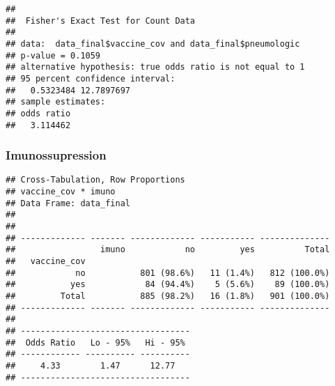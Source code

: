 \documentclass[
]{article}
\newenvironment{Shaded}{\begin{snugshade}}{\end{snugshade}}
\newcommand{\AttributeTok}[1]{\textcolor[rgb]{0.77,0.63,0.00}{#1}}
\newcommand{\ConstantTok}[1]{\textcolor[rgb]{0.00,0.00,0.00}{#1}}
\newcommand{\FunctionTok}[1]{\textcolor[rgb]{0.00,0.00,0.00}{#1}}
\newcommand{\NormalTok}[1]{#1}
\newcommand{\SpecialCharTok}[1]{\textcolor[rgb]{0.00,0.00,0.00}{#1}}
\newcommand{\StringTok}[1]{\textcolor[rgb]{0.31,0.60,0.02}{#1}}
\begin{document}
\begin{Shaded}
\end{Shaded}

\begin{verbatim}
## 
##  Fisher's Exact Test for Count Data
## 
## data:  data_final$vaccine_cov and data_final$pneumologic
## p-value = 0.1059
## alternative hypothesis: true odds ratio is not equal to 1
## 95 percent confidence interval:
##   0.5323484 12.7897697
## sample estimates:
## odds ratio 
##   3.114462
\end{verbatim}

\hypertarget{imunossupression}{%
\subsubsection{Imunossupression}\label{imunossupression}}

\begin{Shaded}
\end{Shaded}

\begin{verbatim}
## Cross-Tabulation, Row Proportions  
## vaccine_cov * imuno  
## Data Frame: data_final  
## 
## 
## ------------- ------- ------------- ----------- --------------
##                 imuno            no         yes          Total
##   vaccine_cov                                                 
##            no           801 (98.6%)   11 (1.4%)   812 (100.0%)
##           yes            84 (94.4%)    5 (5.6%)    89 (100.0%)
##         Total           885 (98.2%)   16 (1.8%)   901 (100.0%)
## ------------- ------- ------------- ----------- --------------
## 
## ----------------------------------
##  Odds Ratio   Lo - 95%   Hi - 95% 
## ------------ ---------- ----------
##     4.33        1.47      12.77   
## ----------------------------------
\end{verbatim}
\end{document}
